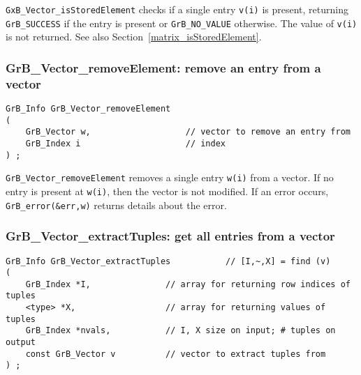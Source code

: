 \documentclass[12pt]{article}
\begin{document}
\verb'GxB_Vector_isStoredElement' checks if a single entry \verb'v(i)'
is present, returning \verb'GrB_SUCCESS' if the entry is present or
\verb'GrB_NO_VALUE' otherwise.  The value of \verb'v(i)' is not returned.
See also Section~\ref{matrix_isStoredElement}.

\subsubsection{{\sf GrB\_Vector\_removeElement:} remove an entry from a vector}
\label{vector_removeElement}

\begin{mdframed}[userdefinedwidth=6in]
{\footnotesize
\begin{verbatim}
GrB_Info GrB_Vector_removeElement
(
    GrB_Vector w,                   // vector to remove an entry from
    GrB_Index i                     // index
) ;
\end{verbatim} } \end{mdframed}

\verb'GrB_Vector_removeElement' removes a single entry \verb'w(i)' from a vector.
If no entry is present at \verb'w(i)', then the vector is not modified.
If an error occurs, \verb'GrB_error(&err,w)' returns details about the error.

\subsubsection{{\sf GrB\_Vector\_extractTuples:} get all entries from a vector}
\label{vector_extractTuples}

\begin{mdframed}[userdefinedwidth=6in]
{\footnotesize
\begin{verbatim}
GrB_Info GrB_Vector_extractTuples           // [I,~,X] = find (v)
(
    GrB_Index *I,               // array for returning row indices of tuples
    <type> *X,                  // array for returning values of tuples
    GrB_Index *nvals,           // I, X size on input; # tuples on output
    const GrB_Vector v          // vector to extract tuples from
) ;
\end{verbatim} } \end{mdframed}
\end{document}
